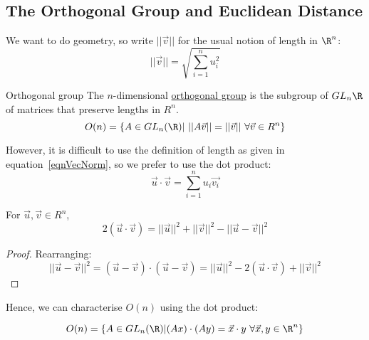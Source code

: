 \documentclass[../Main.tex]{subfiles}
\begin{document}
\subsection{The Orthogonal Group and Euclidean Distance}
We want to do geometry, so write $||\vec{v}||$ for the usual notion of length in $\R^n$:
\begin{equation}
    ||\vec{v}|| = \sqrt{\sum_{i=1}^{n}u_i^2}
    \label{eqnVecNorm}
\end{equation}
\begin{definition}{Orthogonal group}
    The $n$-dimensional \underline{orthogonal group} is the subgroup of $GL_n{\R}$ of matrices that preserve lengths in $R^n$.
    \begin{equation*}
        O(n) = \{A \in GL_n(\R) |~||A\vec{v}|| = ||\vec{v}||~\forall \vec{v} \in R^n\}
    \end{equation*}
\end{definition}
However, it is difficult to use the definition of length as given in equation~\ref{eqnVecNorm}, so we prefer to use the dot product:
\begin{equation}
    \vec{u} \cdot \vec{v} = \sum_{i=1}^{n}u_i \vec{v_i}
    \label{eqnDotProduct}
\end{equation}
\begin{lemma}
    \label{lemPolarisation}
    For $\vec{u}, \vec{v} \in R^n$,
    \begin{equation*}
        2(\vec{u} \cdot \vec{v}) = ||\vec{u}||^2 + ||\vec{v}||^2 - ||\vec{u} - \vec{v}||^2
    \end{equation*}
\end{lemma}
\begin{proof}
    Rearranging:
    \begin{equation*}
        ||\vec{u}-\vec{v}||^2 = (\vec{u}-\vec{v}) \cdot (\vec{u}-\vec{v}) = ||\vec{u}||^2 - 2 (\vec{u} \cdot \vec{v}) + ||\vec{v}||^2
    \end{equation*}
\end{proof}
Hence, we can characterise $O(n)$ using the dot product:
\begin{lemma}
    \begin{equation*}
        O(n) = \{A \in GL_n(\R) | (Ax) \cdot (Ay) = \vec{x} \cdot y~\forall \vec{x}, y \in \R^n\}
    \end{equation*}
    \label{lemDotProdOrthoGrp}
\end{lemma}
\end{document}
